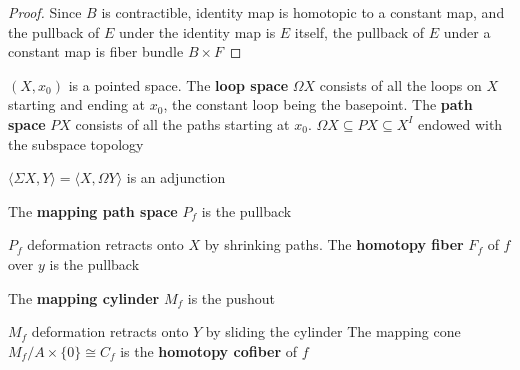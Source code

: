 \documentclass[main]{subfiles}
\begin{document}
\begin{proof}
Since $B$ is contractible, identity map is homotopic to a constant map, and the pullback of $E$ under the identity map is $E$ itself, the pullback of $E$ under a constant map is fiber bundle $B\times F$
\end{proof}

\begin{definition}
$(X,x_0)$ is a pointed space. The \textbf{loop space} $\Omega X$ consists of all the loops on $X$ starting and ending at $x_0$, the constant loop being the basepoint. The \textbf{path space} $PX$ consists of all the paths starting at $x_0$. $\Omega X\subseteq PX\subseteq X^I$ endowed with the subspace topology
\end{definition}

\begin{proposition}
$\langle\Sigma X,Y\rangle=\langle X,\Omega Y\rangle$ is an adjunction
\end{proposition}

\begin{definition}
The \textbf{mapping path space} $P_f$ is the pullback
\begin{center}
\end{center}
$P_f$ deformation retracts onto $X$ by shrinking paths.
The \textbf{homotopy fiber} $F_f$ of $f$ over $y$ is the pullback
\begin{center}
\end{center}
The \textbf{mapping cylinder} $M_f$ is the pushout
\begin{center}
\end{center}
$M_f$ deformation retracts onto $Y$ by sliding the cylinder
The mapping cone $M_f/A\times\{0\}\cong C_f$ is the \textbf{homotopy cofiber} of $f$
\end{definition}
\end{document}
